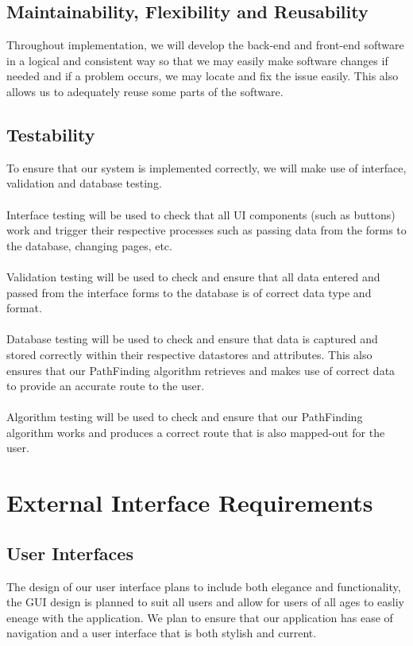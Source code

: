 \documentclass[12pt]{article}
\begin{document}
\subsection{Maintainability, Flexibility and Reusability}
Throughout implementation, we will develop the back-end and front-end software in a logical and consistent way so that we may easily make software changes if needed and if a problem occurs, we may locate and fix the issue easily. This also allows us to adequately reuse some parts of the software.
\subsection{Testability}
To ensure that our system is implemented correctly, we will make use of interface, validation and database testing.\\\\
Interface testing will be used to check that all UI components (such as buttons) work and trigger their respective processes such as passing data from the forms to the database, changing pages, etc.\\\\
Validation testing will be used to check and ensure that all data entered and passed from the interface forms to the database is of correct data type and format.\\\\
Database testing will be used to check and ensure that data is captured and stored correctly within their respective datastores and attributes. This also ensures that our PathFinding algorithm retrieves and makes use of correct data to provide an accurate route to the user.\\\\
Algorithm testing will be used to check and ensure that our PathFinding algorithm works and produces a correct route that is also mapped-out for the user.
\section{External Interface Requirements}
\subsection{User Interfaces}
The design of our user interface plans to include both elegance and functionality, the GUI design is planned to suit all users and allow for users of all ages to easliy eneage with the application. We plan to ensure that our application has ease of navigation and a user interface that is both stylish and current.
\end{document}
